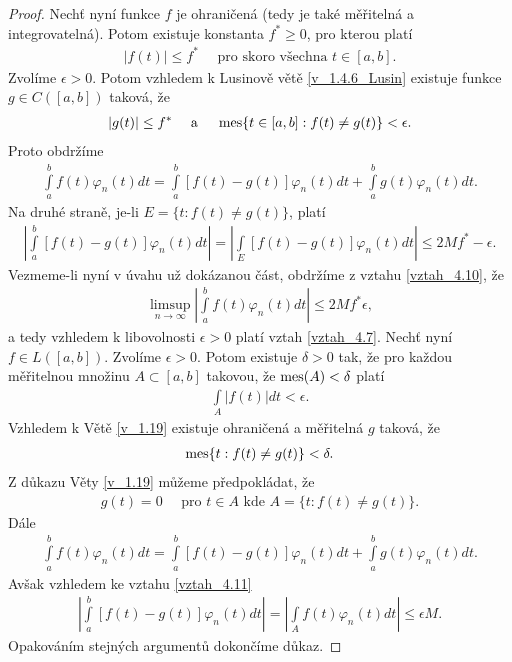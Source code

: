 \begin{theorem}[Lebesgue]
\begin{proof}
Nechť nyní funkce $f$ je ohraničená (tedy je také měřitelná a integrovatelná). Potom existuje konstanta $f^* \geq 0$, pro kterou platí
\begin{align*}
|f(t)| \leq f^* \quad \textrm{ pro skoro všechna } t \in [a,b].
\end{align*}
Zvolíme $\epsilon > 0$. Potom vzhledem k Lusinově větě \ref{v_1.4.6_Lusin} existuje funkce $g \in C([a,b])$ taková, že
\begin{align*}
|g(t)| \leq f^* \quad \textrm{ a } \quad \operatorname{mes}\{t \in [a,b] : f(t) \neq g(t)\} < \epsilon.
\end{align*}
Proto obdržíme
\begin{align}\label{vztah_4.10}
\int \limits_a^b f(t) \varphi_n(t) dt = \int \limits_a^b [f(t) -g(t)] \varphi_n(t) dt + \int \limits_a^b g(t) \varphi_n (t) dt.
\end{align}
Na druhé straně, je-li $E = \{ t : f(t) \neq g(t) \}$, platí
\begin{align*}
\left| \int \limits_a^b [f(t) - g(t)] \varphi_n (t) dt \right| = \left|  \int \limits_E [f(t) - g(t)] \varphi_n (t) dt \right| \leq 2M f^* - \epsilon.
\end{align*}
Vezmeme-li nyní v úvahu už dokázanou část, obdržíme z vztahu \eqref{vztah_4.10}, že
\begin{align*}
\limsup \limits _{n \to \infty} \left| \int \limits_a^b f(t) \varphi_n (t) dt \right| \leq 2M f^* \epsilon,
\end{align*}
a tedy vzhledem k libovolnosti $\epsilon  > 0$ platí vztah \eqref{vztah_4.7}.
Nechť nyní $f \in L([a,b])$. Zvolíme $\epsilon > 0$. Potom existuje $\delta > 0$ tak, že pro každou měřitelnou množinu $A \subset [a,b]$ takovou, že $\operatorname{mes} (A) < \delta$ platí
\begin{align}\label{vztah_4.11}
\int \limits_A |f(t)| dt < \epsilon.
\end{align}
Vzhledem k Větě \ref{v_1.19} existuje ohraničená a měřitelná $g$ taková, že
\begin{align*}
\operatorname{mes}\{t : f(t) \neq g(t)\} < \delta.
\end{align*}
Z důkazu Věty \ref{v_1.19} můžeme předpokládat, že
\begin{align*}
g(t) = 0 \quad \textrm{ pro } t \in A \textrm{ kde } A = \{ t : f(t) \neq g(t) \}.
\end{align*}
Dále
\begin{align*}
\int \limits_a^b f(t) \varphi_n (t) dt = \int \limits_a^b [f(t) - g(t)] \varphi_n (t) dt + \int \limits_a^b g(t) \varphi_n (t) dt.
\end{align*}
Avšak vzhledem ke vztahu \eqref{vztah_4.11}
\begin{align*}
\left| \int \limits_a^b [ f(t) - g(t)] \varphi_n (t) dt \right| = \left| \int \limits_A f(t) \varphi_n (t) dt \right| \leq \epsilon M.
\end{align*}
Opakováním stejných argumentů dokončíme důkaz.
\end{proof}
\end{theorem}


